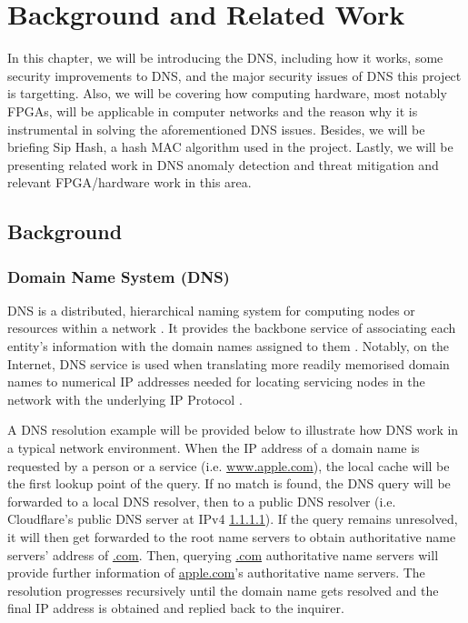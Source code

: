 \documentclass[a4paper]{report}
\begin{document}
\chapter{Background and Related Work}

In this chapter, we will be introducing the DNS, including how it works, some security improvements to DNS, and the major security issues of DNS this project is targetting. Also, we will be covering how computing hardware, most notably FPGAs, will be applicable in computer networks and the reason why it is instrumental in solving the aforementioned DNS issues. Besides, we will be briefing Sip Hash, a hash MAC algorithm used in the project. Lastly, we will be presenting related work in DNS anomaly detection and threat mitigation and relevant FPGA/hardware work in this area.

\section{Background}

\subsection{Domain Name System (DNS)}
DNS is a distributed, hierarchical naming system for computing nodes or resources within a network \cite{RFC-1034}. It provides the backbone service of associating each entity's information with the domain names assigned to them \cite{RFC-1034, RFC-1035}. Notably, on the Internet, DNS service is used when translating more readily memorised domain names to numerical IP addresses needed for locating servicing nodes in the network with the underlying IP Protocol \cite{RFC-1034, RFC-791}.

A DNS resolution example will be provided below to illustrate how DNS work in a typical network environment. When the IP address of a domain name is requested by a person or a service (i.e. \url{www.apple.com}), the local cache will be the first lookup point of the query. If no match is found, the DNS query will be forwarded to a local DNS resolver, then to a public DNS resolver (i.e. Cloudflare's public DNS server at IPv4 \url{1.1.1.1}). If the query remains unresolved, it will then get forwarded to the root name servers to obtain authoritative name servers' address of \url{.com}. Then, querying \url{.com} authoritative name servers will provide further information of \url{apple.com}'s authoritative name servers. The resolution progresses recursively until the domain name gets resolved and the final IP address is obtained and replied back to the inquirer.
\end{document}
